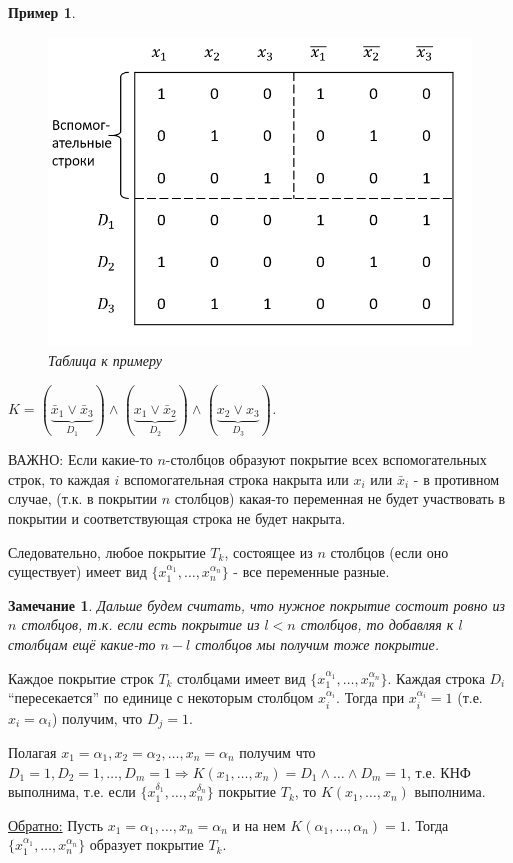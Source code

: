 \documentclass{article}
\newtheorem{example}{Пример}
\newtheorem{Remark}{Замечание}
\numberwithin{example}{section}
\numberwithin{question}{section}
\numberwithin{Remark}{section}
\numberwithin{theorem}{section}
\numberwithin{definition}{section}
\numberwithin{proposition}{section}
\begin{document}
 \begin{example}
 	\begin{figure}[!htp]
 		\centering
 		\includegraphics[width=0.5\linewidth]{12-2}
 		\caption{Таблица к примеру}
 	\end{figure}
 	\label{ex-12-1}
 	$K=(\underbrace{\bar{x}_1\vee \bar{x}_3}_{D_1})\wedge (\underbrace{x_1\vee \bar{x}_2}_{D_2})\wedge(\underbrace{x_2\vee x_3}_{D_3})$.
 \end{example}
ВАЖНО: Если какие-то $n$-столбцов образуют покрытие всех вспомогательных строк, то каждая $i$ вспомогательная строка накрыта или $x_i$ или $\bar{x}_i$ - в противном случае, (т.к. в покрытии $n$ столбцов) какая-то переменная не будет участвовать в покрытии и соответствующая строка не будет накрыта.

Следовательно, любое покрытие $T_k$, состоящее из $n$ столбцов (если оно существует) имеет вид $\{x_1^{\alpha_1},\ldots,x_n^{\alpha_n} \}$ - все переменные разные.
\begin{Remark}
	Дальше будем считать, что нужное покрытие состоит ровно из $n$ столбцов, т.к. если есть покрытие из $l<n$ столбцов, то добавляя к $l$ столбцам ещё какие-то $n-l$ столбцов мы получим тоже покрытие.
\end{Remark}
Каждое покрытие строк $T_k$ столбцами имеет вид $\{x_1^{\alpha_1},\ldots,x_n^{\alpha_n} \}$. Каждая строка $D_i$ ``пересекается'' по единице с некоторым столбцом $x_i^{\alpha_i}$. Тогда при $x_i^{\alpha_i}=1$ (т.е. $x_i=\alpha_i$) получим, что $D_j=1$.

Полагая $x_1=\alpha_1,x_2=\alpha_2,\ldots,x_n=\alpha_n$ получим что $D_1=1,D_2=1,\ldots,D_m=1\Rightarrow K(x_1,\ldots,x_n)=D_1\wedge\ldots\wedge D_m=1$, т.е. КНФ выполнима, т.е. если $\{x_1^{\delta_1},\ldots,x_n^{\delta_n} \}$ покрытие $T_k$, то $K(x_1,\ldots,x_n)$ выполнима.

\underline{Обратно:} Пусть $x_1=\alpha_1,\ldots,x_n=\alpha_n$ и на нем $K(\alpha_1,\ldots,\alpha_n)=1$. Тогда $\{x_1^{\alpha_1},\ldots,x_n^{\alpha_n} \}$ образует покрытие $T_k$. 
\end{document}
